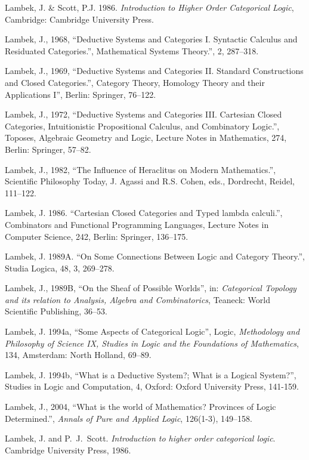 \documentclass[12pt]{article}
\theoremstyle{plain}
\theoremstyle{definition}
\numberwithin{equation}{section}
\begin{document}
\begin{thebibliography}{99}
Lambek, J. \& Scott, P.J. 1986. {\em Introduction to Higher Order Categorical Logic}, Cambridge: Cambridge University Press. 

Lambek, J., 1968, ``Deductive Systems and Categories I. Syntactic Calculus and Residuated Categories.'', Mathematical Systems Theory.'', 2, 287--318. 

Lambek, J., 1969, ``Deductive Systems and Categories II. Standard Constructions and Closed Categories.'', Category Theory, Homology Theory and their Applications I'', Berlin: Springer, 76--122. 

Lambek, J., 1972, ``Deductive Systems and Categories III. Cartesian Closed Categories, Intuitionistic Propositional Calculus, and Combinatory Logic.'', Toposes, Algebraic Geometry and Logic, Lecture Notes in Mathematics, 274, Berlin: Springer, 57--82.  

Lambek, J., 1982, ``The Influence of Heraclitus on Modern Mathematics.'', Scientific Philosophy Today, J. Agassi and R.S. Cohen, eds., Dordrecht, Reidel, 111--122.  

Lambek, J. 1986. ``Cartesian Closed Categories and Typed lambda calculi.'', Combinators and Functional Programming Languages, Lecture Notes in Computer Science, 242, Berlin: Springer, 136--175.   

Lambek, J. 1989A. ``On Some Connections Between Logic and Category Theory.'', Studia Logica, 48, 3, 269--278. 

Lambek, J., 1989B, ``On the Sheaf of Possible Worlds'', in: {\em Categorical Topology and its relation to Analysis, Algebra and Combinatorics}, Teaneck: World Scientific Publishing, 36--53. 

Lambek, J. 1994a, ``Some Aspects of Categorical Logic'', Logic, {\em Methodology and Philosophy of Science IX, Studies in Logic and the Foundations of Mathematics}, 134, Amsterdam: North Holland, 69--89. 

Lambek, J. 1994b, ``What is a Deductive System?; What is a Logical System?'', Studies in Logic and Computation, 4, Oxford: Oxford University Press, 141-159.  
 
Lambek, J., 2004, ``What is the world of Mathematics? Provinces of Logic Determined.'', {\em Annals of Pure and Applied Logic}, 126(1-3), 149--158. 

Lambek, J. and P.~J.~Scott. {\em Introduction to higher order categorical logic}. Cambridge University Press, 1986.


\end{thebibliography}
\end{document}
